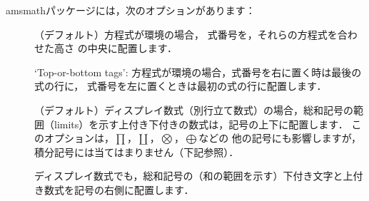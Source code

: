 \documentclass[leqno,titlepage,openany]{amsldoc}[1999/12/13]
\newcommand{\nipkg}{\textsf}
\begin{document}
\nipkg{amsmath}パッケージには，次のオプションがあります：
\begin{description}

\item[] （デフォルト）方程式が環境の場合，
式番号を，それらの方程式を合わせた高さ
の中央に配置します．

\item[] `Top-or-bottom tags': 方程式が環境の場合，式番号を右に置く時は最後の式の行に，
式番号を左に置くときは最初の式の行に配置します．

\item[] （デフォルト）ディスプレイ数式（別行立て数式）の場合，総和記号の範囲（limits）を示す上付き下付きの数式は，記号の上下に配置します．\relax
{}
このオプションは，$\prod$，$\coprod$，$\bigotimes$，$\bigoplus$などの
他の記号にも影響しますが，積分記号には当てはまりません（下記参照）．

\item[] ディスプレイ数式でも，総和記号の（和の範囲を示す）下付き文字と上付き数式を記号の右側に配置します．


\end{description}
\end{document}
